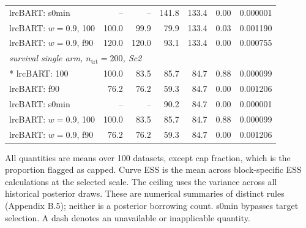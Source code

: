 \begin{longtable}{lrrrrrr}
lrcBART: s0min & -- & -- & 141.8 & 133.4 & 0.00 & 0.000001 \\
lrcBART: $w=0.9$, 100 & 100.0 & 99.9 & 79.9 & 133.4 & 0.03 & 0.001190 \\
lrcBART: $w=0.9$, f90 & 120.0 & 120.0 & 93.1 & 133.4 & 0.00 & 0.000755 \\
\multicolumn{7}{l}{\strut\textit{survival single arm, $n_{\mathrm{trt}}=200$, Sc2}}\\*
lrcBART: 100 & 100.0 & 83.5 & 85.7 & 84.7 & 0.88 & 0.000099 \\
lrcBART: f90 & 76.2 & 76.2 & 59.3 & 84.7 & 0.00 & 0.001206 \\
lrcBART: s0min & -- & -- & 90.2 & 84.7 & 0.00 & 0.000001 \\
lrcBART: $w=0.9$, 100 & 100.0 & 83.5 & 85.7 & 84.7 & 0.88 & 0.000099 \\
lrcBART: $w=0.9$, f90 & 76.2 & 76.2 & 59.3 & 84.7 & 0.00 & 0.001206 \\
\end{longtable}
\noindent\begin{minipage}{\linewidth}\footnotesize All quantities are means over 100 datasets, except cap fraction, which is the proportion flagged as capped. Curve ESS is the mean across block-specific ESS calculations at the selected scale. The ceiling uses the variance across all historical posterior draws. These are numerical summaries of distinct rules (Appendix B.5); neither is a posterior borrowing count. s0min bypasses target selection. A dash denotes an unavailable or inapplicable quantity.\end{minipage}
\endgroup
